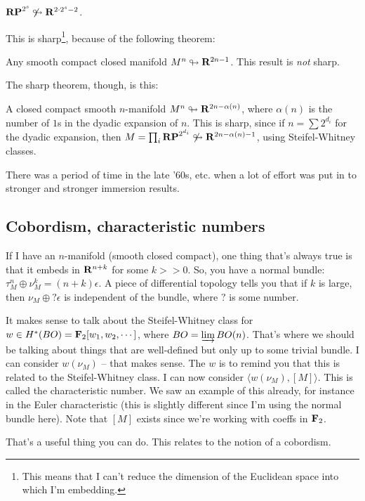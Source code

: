 \begin{example}
\begin{theorem}
	$\mathbf{RP}^{2^s}\not \looparrowright \mathbf R^{2\cdot 2^{s}-2}$.
    \end{theorem}
    This is sharp\footnote{This means that I can't reduce the dimension of the Euclidean space into which I'm embedding.}, because of the following theorem:
    \begin{theorem}[Whitney]
	Any smooth compact closed manifold $M^n \looparrowright \mathbf R^{2n-1}$.
	This result is \emph{not} sharp.
    \end{theorem}
    The sharp theorem, though, is this:
    \begin{theorem}
	A closed compact smooth $n$-manifold $M^n \looparrowright \mathbf R^{2n-\alpha(n)}$, where $\alpha(n)$ is the number of $1$s in the dyadic expansion of $n$.
	This is sharp, since if $n=\sum 2^{d_i}$ for the dyadic expansion, then $M = \prod_i \mathbf{RP}^{2^{d_i}} \not \looparrowright \mathbf R^{2n-\alpha(n)-1}$, using Steifel-Whitney classes.
    \end{theorem}
\end{example}
There was a period of time in the late '60s, etc. when a lot of effort was put in to stronger and stronger immersion results.
\subsection{Cobordism, characteristic numbers}
If I have an $n$-manifold (smooth closed compact), one thing that's always true is that it embeds in $\mathbf R^{n+k}$ for some $k>>0$.
So, you have a normal bundle: $\tau_M^n\oplus \nu_M^k = (n+k)\epsilon$.
A piece of differential topology tells you that if $k$ is large, then $\nu_M\oplus ?\epsilon$ is independent of the bundle, where $?$ is some number.

It makes sense to talk about the Steifel-Whitney class for $w\in H^\ast(BO) = \mathbf F_2[w_1,w_2,\cdots]$, where $BO = \varinjlim BO(n)$.
That's where we should be talking about things that are well-defined but only up to some trivial bundle.
I can consider $w(\nu_M)$ -- that makes sense.
The $w$ is to remind you that this is related to the Steifel-Whitney class.
I can now consider $\langle w(\nu_M),[M]\rangle$.
This is called the characteristic number.
We saw an example of this already, for instance in the Euler characteristic (this is slightly different since I'm using the normal bundle here).
Note that $[M]$ exists since we're working with coeffs in $\mathbf F_2$.

That's a useful thing you can do.
This relates to the notion of a cobordism.


